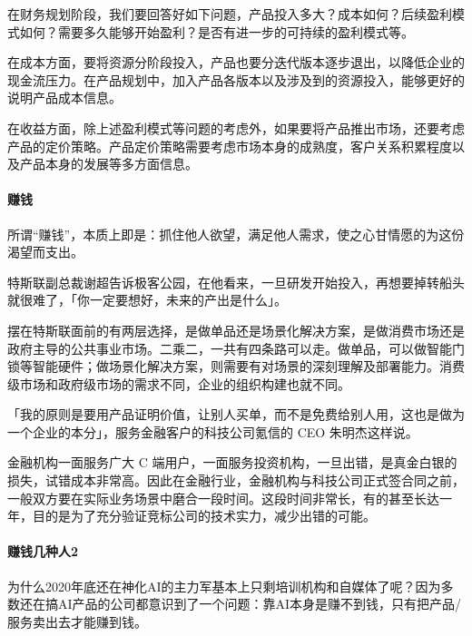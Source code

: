 \documentclass[letterpaper,10pt,english]{sphinxmanual}
\begin{document}
在财务规划阶段，我们要回答好如下问题，产品投入多大？成本如何？后续盈利模式如何？需要多久能够开始盈利？是否有进一步的可持续的盈利模式等。

在成本方面，要将资源分阶段投入，产品也要分迭代版本逐步退出，以降低企业的现金流压力。在产品规划中，加入产品各版本以及涉及到的资源投入，能够更好的说明产品成本信息。

在收益方面，除上述盈利模式等问题的考虑外，如果要将产品推出市场，还要考虑产品的定价策略。产品定价策略需要考虑市场本身的成熟度，客户关系积累程度以及产品本身的发展等多方面信息。


\paragraph{赚钱}
\label{\detokenize{chapter_introduction/money:id3}}
所谓“赚钱”，本质上即是：抓住他人欲望，满足他人需求，使之心甘情愿的为这份渴望而支出。

特斯联副总裁谢超告诉极客公园，在他看来，一旦研发开始投入，再想要掉转船头就很难了，「你一定要想好，未来的产出是什么」。%
\begin{footnote}[139]\sphinxAtStartFootnote
{}
%
\end{footnote}

摆在特斯联面前的有两层选择，是做单品还是场景化解决方案，是做消费市场还是政府主导的公共事业市场。二乘二，一共有四条路可以走。做单品，可以做智能门锁等智能硬件；做场景化解决方案，则需要有对场景的深刻理解及部署能力。消费级市场和政府级市场的需求不同，企业的组织构建也就不同。

「我的原则是要用产品证明价值，让别人买单，而不是免费给别人用，这也是做为一个企业的本分」，服务金融客户的科技公司氪信的
CEO 朱明杰这样说。

金融机构一面服务广大 C
端用户，一面服务投资机构，一旦出错，是真金白银的损失，试错成本非常高。因此在金融行业，金融机构与科技公司正式签合同之前，一般双方要在实际业务场景中磨合一段时间。这段时间非常长，有的甚至长达一年，目的是为了充分验证竞标公司的技术实力，减少出错的可能。


\paragraph{赚钱几种人2\sphinxfootnotemark[140]}
\label{\detokenize{chapter_introduction/money:id4}}%
\begin{footnotetext}[140]\sphinxAtStartFootnote
{}
%
\end{footnotetext}\ignorespaces 
为什么2020年底还在神化AI的主力军基本上只剩培训机构和自媒体了呢？因为多数还在搞AI产品的公司都意识到了一个问题：靠AI本身是赚不到钱，只有把产品/服务卖出去才能赚到钱。
\end{document}
